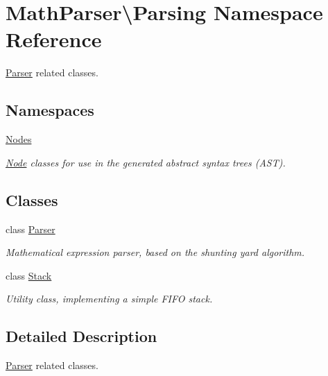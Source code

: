 \hypertarget{namespaceMathParser_1_1Parsing}{\section{Math\-Parser\textbackslash{}Parsing Namespace Reference}
\label{namespaceMathParser_1_1Parsing}
}


\hyperlink{classMathParser_1_1Parsing_1_1Parser}{Parser} related classes.  


\subsection*{Namespaces}
\begin{DoxyCompactItemize}
\item 
\hyperlink{namespaceMathParser_1_1Parsing_1_1Nodes}{Nodes}
\begin{DoxyCompactList}\small\item\em \hyperlink{classMathParser_1_1Parsing_1_1Nodes_1_1Node}{Node} classes for use in the generated abstract syntax trees (A\-S\-T). \end{DoxyCompactList}\end{DoxyCompactItemize}
\subsection*{Classes}
\begin{DoxyCompactItemize}
\item 
class \hyperlink{classMathParser_1_1Parsing_1_1Parser}{Parser}
\begin{DoxyCompactList}\small\item\em Mathematical expression parser, based on the shunting yard algorithm. \end{DoxyCompactList}\item 
class \hyperlink{classMathParser_1_1Parsing_1_1Stack}{Stack}
\begin{DoxyCompactList}\small\item\em Utility class, implementing a simple F\-I\-F\-O stack. \end{DoxyCompactList}\end{DoxyCompactItemize}


\subsection{Detailed Description}
\hyperlink{classMathParser_1_1Parsing_1_1Parser}{Parser} related classes. 
